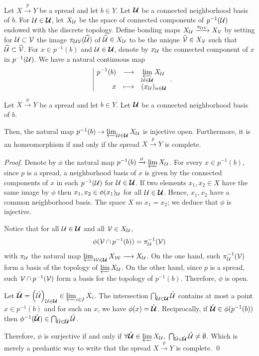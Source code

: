 Let $X\xrightarrow{p} Y$ be a spread and let $b\in Y$. Let $\boldsymbol{\mathcal{U}}$ be a connected neighborhood basis of $b$. For $\mathcal{U} \in \boldsymbol{\mathcal{U}}$, let $X_{\mathcal{U}}$ be the space of connected components of $p^{-1}(\mathcal{U})$ endowed with the discrete
 topology. Define bonding maps $X_{\mathcal{U}}\xrightarrow{\pi_{\mathcal{U}\mathcal V}} X_\mathcal V$ by setting for $\mathcal{U}\subset \mathcal V$ the image $\pi_{\mathcal{U}\mathcal V}(\widehat{\mathcal{U}})$ of $\widehat {\mathcal{U}}\in X_{\mathcal{U}}$ to be the unique $\widehat {\mathcal V}\in X_\mathcal V$ such that $\widehat {\mathcal{U}} \subset \widehat {\mathcal V}$. For $x\in p^{-1}(b)$ and $\mathcal{U}\in \boldsymbol{\mathcal{U}}$, denote by $x_{\mathcal{U}}$ the connected component of $x$ in $p^{-1}(\mathcal{U})$.
 We have a natural continuous map $$\displaystyle\begin{array}{l|rcl} & \displaystyle p^{-1}(b) & \longrightarrow & \displaystyle \varprojlim_{\mathcal{U}\in \boldsymbol{\mathcal{U}}}X_{\mathcal{U}} \\ & \displaystyle x & \longmapsto & \displaystyle (x_{\mathcal{U}})_{u\in \boldsymbol {\mathcal{U}}} \end{array}.$$

\begin{prop}[\cite{MR2198590}] \label{prop:spread_fiber}
 Let $X\xrightarrow{p} Y$ be a spread and let $b\in Y$. Let $\boldsymbol{\mathcal{U}}$ be a connected neighborhood basis of $b$. 
 
 Then, the  natural map $p^{-1}(b) \rightarrow \varprojlim_{\mathcal{U}\in \boldsymbol{\mathcal{U}}}X_{\mathcal{U}}$ 
 is injective open. 
 Furthermore, it is an homeomorphism if and only if the spread $X\xrightarrow{p}Y$ is complete.

\end{prop}
\begin{proof}
 Denote by $\phi$ the natural map
 $p^{-1}(b) \xrightarrow{\phi}\varprojlim X_{\mathcal{U}}$. For every $x\in p^{-1}(b)$, since $p$ is a spread, a neighborhood basis of $x$ is given by the connected components of $x$ in each $p^{-1}(\mathcal{U})$ for $\mathcal{U}\in \boldsymbol{\mathcal{U}}$. 
 If two elements $x_1,x_2 \in X$ have the same image by $\phi$ then $x_1,x_2 \in \phi(x_1)_{\mathcal{U}}$ for all $\mathcal{U}\in \boldsymbol{\mathcal{U}}$. Hence, $x_1,x_2$ have a common neighborhood basis. The space $X$ so $x_1=x_2$; we deduce that $\phi$ is injective.
 

 Notice that for all $\mathcal{U}\in \boldsymbol{\mathcal{U}}$ and all $\mathcal V\in X_{\mathcal{U}}$, $$\phi(\mathcal V\cap p^{-1}(b)) = \pi_{\mathcal{U}}^{-1}(\mathcal V)$$
 {with $\pi_{\mathcal{U}}$ the natural map $\varprojlim_{\mathcal W\in \boldsymbol{\mathcal{U}}} X_\mathcal W \xrightarrow{~~~} X_{\mathcal{U}}$.}
 On the one hand, such $\pi_{\mathcal{U}}^{-1}(\mathcal V)$ form a basis of the topology of $\varprojlim X_{\mathcal{U}}$. On the other hand, since $p$ is a spread, such $\mathcal V\cap p^{-1}(\mathcal V)$ form a basis for the topology of $p^{-1}(b)$. 
 Therefore, $\phi$ is open.
 
  Let $\hat{\boldsymbol{\mathcal{U}}}=\left(\hat{\mathcal{U}}\right)_{\mathcal{U}\in \boldsymbol{\mathcal{U}}} \in \varprojlim_{i\in I}X_i$. The intersection $\bigcap_{\mathcal{U}\in \boldsymbol{\mathcal{U}}}\hat{\mathcal{U}}$ contains at most a point $x \in p^{-1}(b)$  and for such an $x$, we have $\phi(x)=\hat{\boldsymbol{\mathcal{U}}}$.  Reciprocally, if $\hat{\boldsymbol {\mathcal{U}}} \in \phi(p^{-1}(b))$ then  $\phi^{-1}(\hat{\boldsymbol{\mathcal{U}}}) \in \bigcap_{\hat{\mathcal{U}}\in \hat{\boldsymbol{\mathcal{U}}}}\hat{\mathcal{U}}$. 
  
  Therefore, $\phi$ is surjective if and only if $\forall \hat{\boldsymbol {\mathcal{U}}}\in \varprojlim X_{\mathcal{U}}, ~ \bigcap_{\hat{\mathcal{U}}\in \hat{\boldsymbol{\mathcal{U}}}}\hat{\mathcal{U}} \neq \emptyset$. Which is merely a predantic way to write that the spread $X\xrightarrow{p}Y$ is complete. 
\qed\end{proof}
